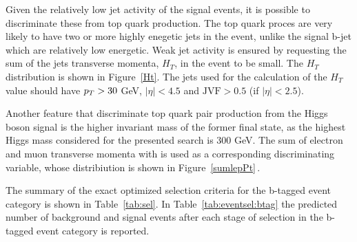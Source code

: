 Given the relatively low jet activity of the signal events, it is possible to discriminate these from
top quark production. The top quark proces are very likely to have two or more highly enegetic jets in the event, unlike the signal
b-jet which are relatively low energetic.
Weak jet activity is ensured by requesting the sum of the jets transverse momenta, $H_T$,  in the event to be small.
The $H_T$ distribution is shown in Figure~\ref{Ht}. The jets used for the calculation of the $H_T$ value 
should have $p_{T} > 30 $ GeV, $|\eta| < 4.5$  and $\text{JVF} > 0.5 $ (if $|\eta| < 2.5$).

Another feature that discriminate top quark  pair production from the Higgs boson signal is the higher invariant mass of the former final state, 
as the highest Higgs mass considered for the presented  search is 300 GeV.
The sum of electron and muon transverse momenta with \met is  used as 
a corresponding discriminating variable, whose distribiution is shown in Figure~\ref{sumlepPt}$\,.$

The summary of the exact optimized selection criteria for the b-tagged event category is shown in Table~\ref{tab:sel}.
In Table~\ref{tab:eventsel:btag} the predicted number of background and signal events after each stage of selection 
in the b-tagged event category  is reported.


